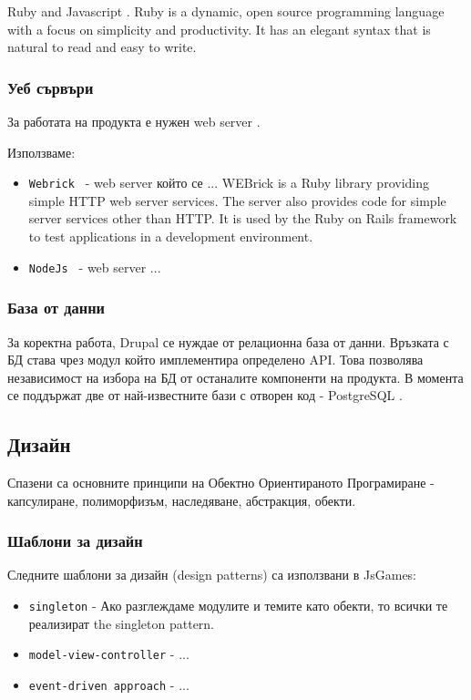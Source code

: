 \documentclass[a4paper]{article}
\def\jsg{JsGames}
\begin{document}
Ruby \cite{ruby} and Javascript \cite{javascript}.
Ruby is a dynamic, open source programming language with a focus on simplicity and productivity. It has an elegant syntax that is natural to read and easy to write.

\subsubsection{Уеб сървъри}

За работата на продукта е нужен web server \cite{webServer}.

Използваме:
\begin{itemize}
  \item \texttt{Webrick \cite{webrick}} - web server който се ...
  WEBrick is a Ruby library providing simple HTTP web server services. The server also provides code for simple server services other than HTTP.
It is used by the Ruby on Rails framework to test applications in a development environment.
  \item \texttt{NodeJs \cite{node}} - web server ...
\end{itemize}


\subsubsection{База от данни}

За коректна работа, Drupal се нуждае от релационна база от данни. Връзката с БД става чрез модул който имплементира определено API. Това позволява независимост на избора на БД от останалите компоненти на продукта. В момента се поддържат две от най-известните бази с отворен код - PostgreSQL \cite{postgresql}.

\subsection{Дизайн} 
Спазени са основните принципи на Обектно Ориентираното Програмиране \cite{oop} - капсулиране, полиморфизъм, наследяване, абстракция, обекти.

\subsubsection{Шаблони за дизайн}
Следните шаблони за дизайн (design patterns) са използвани в \jsg: 

\begin{itemize}
  \item \texttt{singleton} - Ако разглеждаме модулите и темите като обекти, то всички те реализират the singleton pattern. 
  \item \texttt{model-view-controller} - ...
  \item \texttt{event-driven approach} - ...
\end{itemize}
\end{document}
